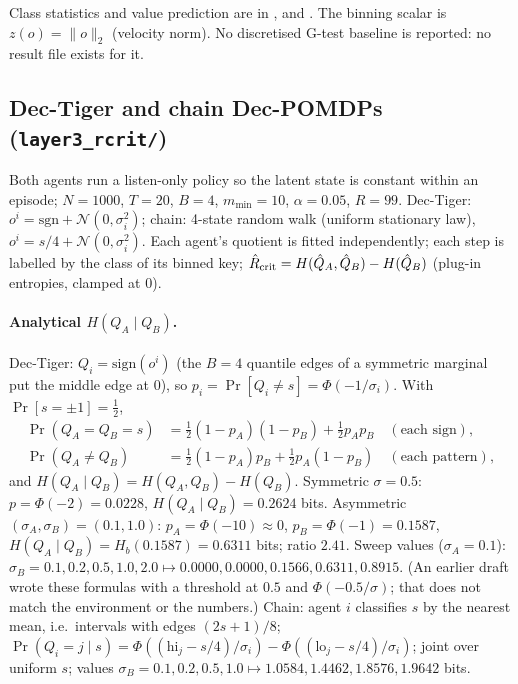 \documentclass[10pt]{article}
\begin{document}
Class statistics and value prediction are in
,
 and
.  The binning scalar is
$z(o)=\|o\|_2$ (velocity norm).  No discretised G-test baseline is reported:
no result file exists for it.

\subsection{Dec-Tiger and chain Dec-POMDPs (\texttt{layer3\_rcrit/})}
\label{sec:rcrit-details}
Both agents run a listen-only policy so the latent state is constant within an
episode; $N=1000$, $T=20$, $B=4$, $m_{\min}=10$, $\alpha=0.05$, $R=99$.
Dec-Tiger: $o^i=\mathrm{sgn}+\mathcal N(0,\sigma_i^2)$; chain: 4-state random
walk (uniform stationary law), $o^i=s/4+\mathcal N(0,\sigma_i^2)$.  Each agent's
quotient is fitted independently; each step is labelled by the class of its
binned key; $\hat R_{\rm crit}=H(\hat Q_A,\hat Q_B)-H(\hat Q_B)$ (plug-in
entropies, clamped at $0$).

\paragraph{Analytical $H(Q_A\mid Q_B)$.}
Dec-Tiger: $Q_i=\mathrm{sign}(o^i)$ (the $B=4$ quantile edges of a symmetric
marginal put the middle edge at $0$), so $p_i=\Pr[Q_i\ne s]=\Phi(-1/\sigma_i)$.
With $\Pr[s=\pm1]=\tfrac12$,
\begin{align*}
  \Pr(Q_A=Q_B=s)     &=\tfrac12(1-p_A)(1-p_B)+\tfrac12p_Ap_B \quad(\text{each sign}),\\
  \Pr(Q_A\ne Q_B)    &=\tfrac12(1-p_A)p_B+\tfrac12p_A(1-p_B)\quad(\text{each pattern}),
\end{align*}
and $H(Q_A\mid Q_B)=H(Q_A,Q_B)-H(Q_B)$.  Symmetric $\sigma=0.5$:
$p=\Phi(-2)=0.0228$, $H(Q_A\mid Q_B)=0.2624$ bits.  Asymmetric
$(\sigma_A,\sigma_B)=(0.1,1.0)$: $p_A=\Phi(-10)\approx0$, $p_B=\Phi(-1)=0.1587$,
$H(Q_A\mid Q_B)=H_b(0.1587)=0.6311$ bits; ratio $2.41$.  Sweep values
($\sigma_A=0.1$): $\sigma_B=0.1,0.2,0.5,1.0,2.0\mapsto0.0000,0.0000,0.1566,0.6311,0.8915$.
(An earlier draft wrote these formulas with a threshold at $0.5$ and
$\Phi(-0.5/\sigma)$; that does not match the environment or the numbers.)
Chain: agent $i$ classifies $s$ by the nearest mean, i.e.\ intervals with edges
$(2s+1)/8$; $\Pr(Q_i=j\mid s)=\Phi((\text{hi}_j-s/4)/\sigma_i)-\Phi((\text{lo}_j-s/4)/\sigma_i)$;
joint over uniform $s$; values $\sigma_B=0.1,0.2,0.5,1.0\mapsto1.0584,1.4462,1.8576,1.9642$ bits.
\end{document}
